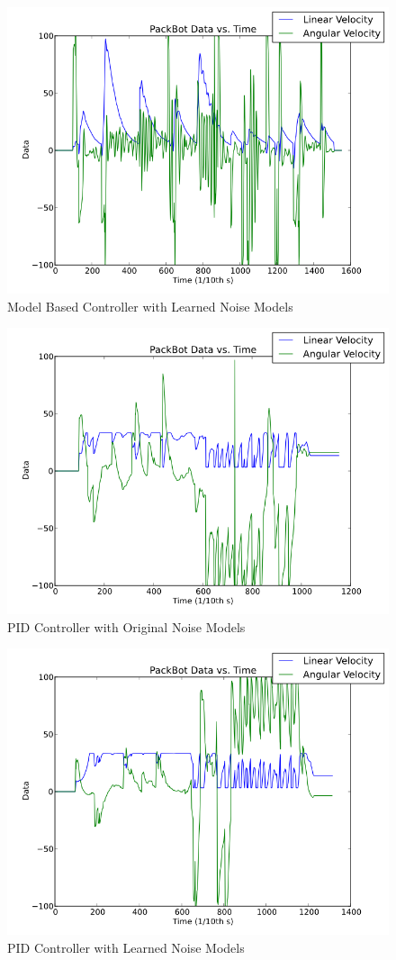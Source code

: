 \begin{figure}[ht!]
	\centering
	\includegraphics[width=.5\textwidth]{images/pbtx/20101203_1545_pbtxLyapNewQR}
	\caption{Model Based Controller with Learned Noise Models}
	\label{fig:resultsLyapunov2}
\end{figure}

\begin{figure}[ht!]
	\centering
	\includegraphics[width=.5\textwidth]{images/pbtx/20101203_1755_pbtxPidOrigQR}
	\caption{PID Controller with Original Noise Models}
	\label{fig:resultsLyapunov3}
\end{figure}

\begin{figure}[ht!]
	\centering
	\includegraphics[width=.5\textwidth]{images/pbtx/20101203_1751_pbtxPidNewQR}
	\caption{PID Controller with Learned Noise Models}
	\label{fig:resultsLyapunov4}
\end{figure}

